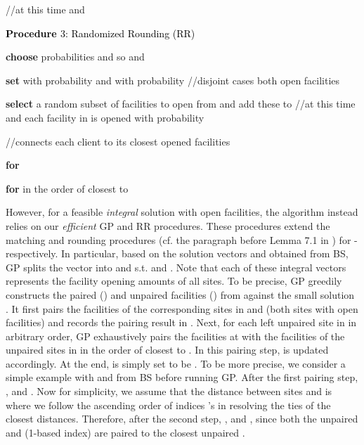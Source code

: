 \documentclass[10pt]{llncs}
\begin{document}
\begin{algorithm}
\qquad{}\qquad{}\qquad{}\qquad{}

\qquad{}\qquad{}\qquad{}\qquad{}

\qquad{}\qquad{}\qquad{}\qquad{}


//at this time  and 

\medskip{}


\textbf{\textcolor{black}{Procedure }}\textcolor{black}{3: Randomized
Rounding (RR)}

\textbf{choose }probabilities  and
 so  and 

\textbf{set}  with probability
 and  with probability
 //disjoint cases both open  facilities

\textbf{select }a random subset of  facilities to open from
 and add these to  //at
this time  and each facility in 
is opened with probability 

//connects each client  to its closest  opened facilities

\textbf{for }

\qquad{}\textbf{for  }in the order of closest to


\qquad{}\qquad{}

\qquad{}\qquad{}
\end{algorithm}


However, for a feasible \textit{integral} solution 
with  open facilities, the algorithm instead relies on our\textit{
efficient} GP and RR procedures. These procedures extend the matching
and rounding procedures (cf. the paragraph before Lemma 7.1 in \cite{Swamy08FTFL2.076})
for - respectively. In particular, based on the solution
vectors  and  obtained from
BS, GP splits the vector  into 
and  s.t. 
and .
Note that each of these integral vectors represents the facility opening
amounts of all sites. To be precise, GP greedily constructs the paired
() and unpaired facilities ()
from  against the small solution .
It first pairs the facilities of the corresponding sites in 
and  (both sites with open facilities) and records
the pairing result in . Next, for each left unpaired
site  in  in arbitrary order, GP
exhaustively pairs the facilities at  with the facilities of the
unpaired sites in  in the order of closest
to . In this pairing step,  is updated accordingly.
At the end,  is simply set to be .
To be more precise, we consider a simple example with 
and  from BS before
running GP. After the first pairing step, ,
 and .
Now for simplicity, we assume that the distance between sites 
and  is  where we follow the ascending order
of indices 's in resolving the ties of the closest distances.
Therefore, after the second step, ,
 and ,
since both the unpaired  and  (1-based
index) are paired to the closest unpaired .
\end{document}
